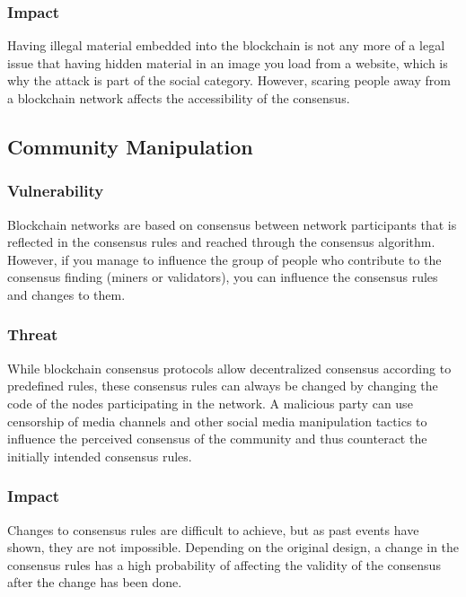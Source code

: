 \documentclass[11pt,a4paper,draft]{article}
\begin{document}
\subsubsection{Impact}

Having illegal material embedded into the blockchain is not any more of a legal issue that having hidden material in an image you load from a website, which is why the attack is part of the social category. However, scaring people away from a blockchain network affects the accessibility of the consensus.\\

\subsection{Community Manipulation}

\subsubsection{Vulnerability}

Blockchain networks are based on consensus between network participants that is reflected in the consensus rules and reached through the consensus algorithm. However, if you manage to influence the group of people who contribute to the consensus finding (miners or validators), you can influence the consensus rules and changes to them.\\

\subsubsection{Threat}

While blockchain consensus protocols allow decentralized consensus according to predefined rules, these consensus rules can always be changed by changing the code of the nodes participating in the network. A malicious party can use censorship of media channels and other social media manipulation tactics to influence the perceived consensus of the community and thus counteract the initially intended consensus rules.\\

\subsubsection{Impact}

Changes to consensus rules are difficult to achieve, but as past events have shown, they are not impossible. Depending on the original design, a change in the consensus rules has a high probability of affecting the validity of the consensus after the change has been done.\\
\end{document}
